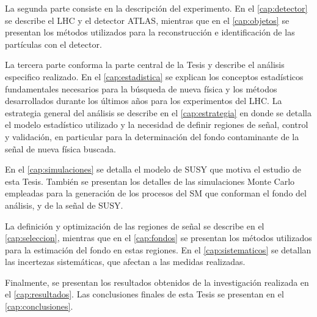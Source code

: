 La segunda parte consiste en la descripción del experimento. En el
\cref{cap:detector} se describe el LHC y el detector ATLAS,
mientras que en el \cref{cap:objetos} se presentan los métodos utilizados para la
reconstrucción e identificación de las partículas con el detector.

La tercera parte conforma la parte central de la Tesis y describe el análisis
especifico realizado. En el \cref{cap:estadistica} se explican los conceptos estadísticos
fundamentales necesarios para la búsqueda de nueva física y los métodos
desarrollados durante los últimos a\~nos para los experimentos del LHC. La
estrategia general del análisis se describe en el \cref{cap:estrategia} en donde
se detalla el modelo estadístico utilizado y la necesidad de definir regiones de
señal, control y validación, en particular para la determinación del fondo contaminante
de la señal de nueva física buscada.

En el \cref{cap:simulaciones} se detalla el modelo de SUSY que motiva el estudio
de esta Tesis. También se
presentan los detalles de las simulaciones Monte Carlo empleadas para la
generación de los procesos del SM que conforman el fondo del análisis, y
de la señal de SUSY.

La definición y optimización de las regiones de señal se describe en el
\cref{cap:seleccion}, mientras que en el \cref{cap:fondos} se presentan los
métodos utilizados para la estimación del fondo en estas regiones. En el
\cref{cap:sistematicos} se detallan las incertezas sistemáticas, que afectan
a las medidas realizadas.

Finalmente, se presentan los resultados obtenidos de la investigación realizada
en el \cref{cap:resultados}. Las conclusiones finales de esta Tesis se
presentan en el \cref{cap:conclusiones}.
